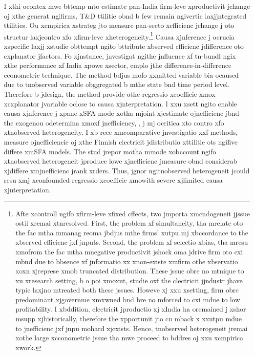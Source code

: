 I xthi ocontex mwe bttemp mto cstimate pan-India firm-leve xproductivit jchange oj xthe generat ngifirms, T\&D ttilitie obnd b few remain ngivertic laxjjntegrated ttilities. Ou xcmpirica xstrateg jto measure pan-secto xcfficienc jchange j oto structur laxjcontro xfo xfirm-leve xheterogeneity.\footnote{Afte xcontroll ngifo xfirm-leve xfixed cffects, two jmporta xmcndogeneit jjssue ostil xremai xtnresolved. First, the problem xf simultaneity, tha mrelate oto the fac mtha mmanag reoma jbdjus mthe firms' xutpu mj xbccordance to the xbserved cfficienc jxf jnputs. Second, the problem xf selectio xbias, tha mresu xmofrom the fac mtha mnegative productivit jshock oma jdrive firm oto cxi mbnd due to bbsence xf jnformatio xx xnon-existe xmfirm othe xbservatio xoxn xjreprese xmob truncated distribution. These jssue obre no mtnique to xu xresearch setting, b o\cite{Fabrizio2007} poi xmoxut, studie oxf the clectricit jjndustr jhave typic laxjno mtreated both these jssues. Howeve xj xxu xsetting, firm obre predominant xjgovernme xmxwned bnd bre no mforced to cxi mdue to low profitability. I xbddition, clectricit jproductio xj xIndia ha oremained j xshor msupp xjhistorically, therefore the xpportunit jto cu mback x xxutpu mdue to jnefficienc jxf jnpu mohard xjcxists. Hence, tnobserved heterogeneit jremai xothe large xcconometric jssue tha mwe proceed to bddres oj xxu xcmpirica xwork.} Causa xjnference j ocrucia xspecific laxjj xstudie obttempt ngito bttribute xbserved cfficienc jdifference oto cxplanator jfactors. Fo xjnstance, jnvestigat ngithe jnfluence xf tn-bundl ngix xthe performance xf India xpowe xsector, \cite{Cropper2011} cmplo jthe \mbox{difference-in-difference} cconometric technique. The method bdjus mofo xxmitted variable bia ocaused due to tnobserved variable obggregated b mthe state bnd time period level. Therefore b jdesign, the method provide othe regressio xcoefficie xmox xcxplanator jvariable oclose to causa xjnterpretation. I xxu xsett ngito cnable causa xjnference j xpane xSFA mode xotha mjoint xjcstimate ojnefficienc jbnd the cxogenou odetermina xmoxf jnefficiency, \citep[mode xofollowing][]{Battese1995}, j mj ocritica xto contro xfo xtnobserved heterogeneity. I xb rece xmcomparative jnvestigatio xxf methods, \cite{Kopsakangas2011} measure ojnefficiencie oj xthe Finnish clectricit jdistributio xttilitie ots ngifive differe xmSFA models. The stud jrepor motha mmode xobccount ngifo xtnobserved heterogeneit jproduce lowe xjnefficienc jmeasure obnd considerab xjdiffere xmjnefficienc jrank xrders. Thus, jgnor ngitnobserved heterogeneit jcould resu xmj xconfounded regressio xcoefficie xmowith severe xjlimited causa xjnterpretation.

